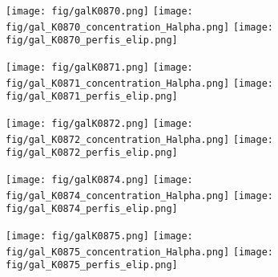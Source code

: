 \begin{figure}[!ht]
\begin{center}
\setcaptionmargin{1cm}
\texttt{[image: fig/galK0870.png]}
\texttt{[image: fig/gal\_K0870\_concentration\_Halpha.png]}
\texttt{[image: fig/gal\_K0870\_perfis\_elip.png]}
\end{center}
\end{figure}


\begin{figure}[!ht]
\begin{center}
\setcaptionmargin{1cm}
\texttt{[image: fig/galK0871.png]}
\texttt{[image: fig/gal\_K0871\_concentration\_Halpha.png]}
\texttt{[image: fig/gal\_K0871\_perfis\_elip.png]}
\end{center}
\end{figure}


\begin{figure}[!ht]
\begin{center}
\setcaptionmargin{1cm}
\texttt{[image: fig/galK0872.png]}
\texttt{[image: fig/gal\_K0872\_concentration\_Halpha.png]}
\texttt{[image: fig/gal\_K0872\_perfis\_elip.png]}
\end{center}
\end{figure}


\begin{figure}[!ht]
\begin{center}
\setcaptionmargin{1cm}
\texttt{[image: fig/galK0874.png]}
\texttt{[image: fig/gal\_K0874\_concentration\_Halpha.png]}
\texttt{[image: fig/gal\_K0874\_perfis\_elip.png]}
\end{center}
\end{figure}


\begin{figure}[!ht]
\begin{center}
\setcaptionmargin{1cm}
\texttt{[image: fig/galK0875.png]}
\texttt{[image: fig/gal\_K0875\_concentration\_Halpha.png]}
\texttt{[image: fig/gal\_K0875\_perfis\_elip.png]}
\end{center}
\end{figure}


